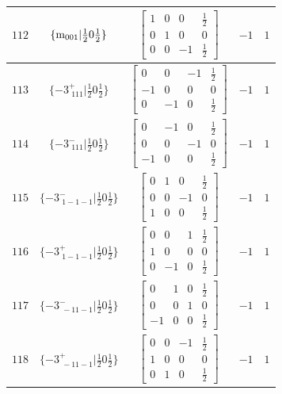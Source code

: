 \documentclass[fleqn,8pt]{jsarticle}
\begin{document}
\begin{longtable}{ccccc}
$ 112 $ & $ \{{\rm m}_{001}|\frac{1}{2} 0 \frac{1}{2}\} $ & $ \begin{bmatrix} 1 & 0 & 0 & \frac{1}{2} \\ 0 & 1 & 0 & 0 \\ 0 & 0 & -1 & \frac{1}{2} \end{bmatrix} $ & $ -1 $ & $ 1 $ \\ \hline
$ 113 $ & $ \{-3^{+}_{\,\,111}|\frac{1}{2} 0 \frac{1}{2}\} $ & $ \begin{bmatrix} 0 & 0 & -1 & \frac{1}{2} \\ -1 & 0 & 0 & 0 \\ 0 & -1 & 0 & \frac{1}{2} \end{bmatrix} $ & $ -1 $ & $ 1 $ \\ \hline
$ 114 $ & $ \{-3^{-}_{\,\,111}|\frac{1}{2} 0 \frac{1}{2}\} $ & $ \begin{bmatrix} 0 & -1 & 0 & \frac{1}{2} \\ 0 & 0 & -1 & 0 \\ -1 & 0 & 0 & \frac{1}{2} \end{bmatrix} $ & $ -1 $ & $ 1 $ \\ \hline
$ 115 $ & $ \{-3^{-}_{\,\,1-1-1}|\frac{1}{2} 0 \frac{1}{2}\} $ & $ \begin{bmatrix} 0 & 1 & 0 & \frac{1}{2} \\ 0 & 0 & -1 & 0 \\ 1 & 0 & 0 & \frac{1}{2} \end{bmatrix} $ & $ -1 $ & $ 1 $ \\ \hline
$ 116 $ & $ \{-3^{+}_{\,\,1-1-1}|\frac{1}{2} 0 \frac{1}{2}\} $ & $ \begin{bmatrix} 0 & 0 & 1 & \frac{1}{2} \\ 1 & 0 & 0 & 0 \\ 0 & -1 & 0 & \frac{1}{2} \end{bmatrix} $ & $ -1 $ & $ 1 $ \\ \hline
$ 117 $ & $ \{-3^{-}_{\,\,-11-1}|\frac{1}{2} 0 \frac{1}{2}\} $ & $ \begin{bmatrix} 0 & 1 & 0 & \frac{1}{2} \\ 0 & 0 & 1 & 0 \\ -1 & 0 & 0 & \frac{1}{2} \end{bmatrix} $ & $ -1 $ & $ 1 $ \\ \hline
$ 118 $ & $ \{-3^{+}_{\,\,-11-1}|\frac{1}{2} 0 \frac{1}{2}\} $ & $ \begin{bmatrix} 0 & 0 & -1 & \frac{1}{2} \\ 1 & 0 & 0 & 0 \\ 0 & 1 & 0 & \frac{1}{2} \end{bmatrix} $ & $ -1 $ & $ 1 $ \\ \hline

\end{longtable}
\end{document}
